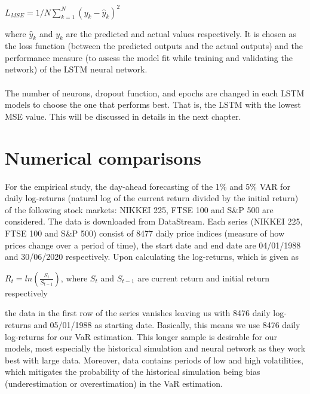 \documentclass[a4paper,11pt,oneside]{book}
\begin{document}
\begin{center}
	$L_{MSE} = 1/N\sum_{k=1}^{N} (y_k-{\hat{y}}_{k})^2$
\end{center}
where $\hat{y}_k$ and $y_k$ are the predicted and actual values respectively. It is chosen as the loss function (between the predicted outputs and the actual outputs) and the performance measure (to assess the model fit while
training and validating the network) of the
LSTM neural network.\\\\
The number of neurons, dropout function, and epochs are changed in each LSTM models to choose the one that performs best. That is, the LSTM with the lowest MSE value. This will be discussed in details in the next chapter.


\chapter{Numerical comparisons}
For the empirical study, the day-ahead forecasting of the 1\% and 5\% VAR for daily log-returns (natural log of the current return divided by the initial return) of the following stock markets: NIKKEI 225, FTSE 100 and S\&P 500 are considered. The data is downloaded from DataStream. Each series (NIKKEI 225, FTSE 100 and S\&P 500) consist of 8477 daily price indices (measure of how prices change over a period of time), the start date and end date are 04/01/1988 and 30/06/2020 respectively. Upon calculating the log-returns, which is given as 

\begin{center}
	$R_t = ln(\frac{S_t}{S_{t-1}})$, where ${S_t}$ and ${S_{t-1}}$ are current return and initial return respectively
\end{center}
the data in the first row of the series vanishes leaving us with 8476 daily log-returns and 05/01/1988 as starting date. Basically, this means we use 8476 daily log-returns for our VaR estimation. This longer sample is desirable for our models, most especially the historical simulation and neural network as they work best with large data. Moreover, data contains periods of low and high volatilities, which mitigates the probability of the historical simulation being bias (underestimation or overestimation) in the VaR estimation.\newline
\end{document}
